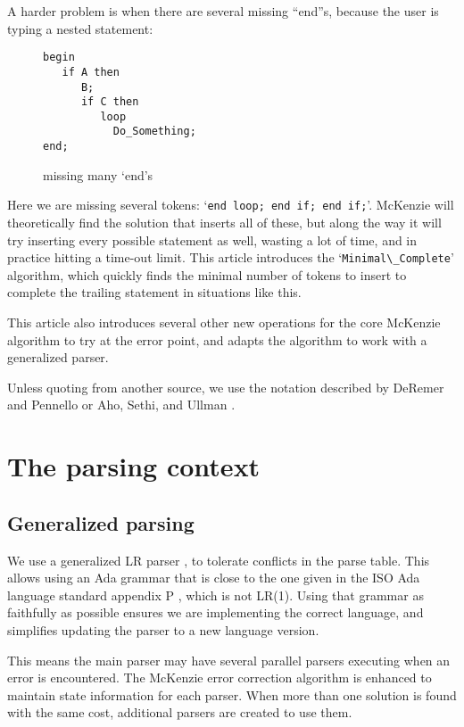 \documentclass[authordraft]{acmart}
\newcommand{\code}[1]{`\lstinline|#1|'}
\begin{document}
A harder problem is when there are several missing ``end''s, because
the user is typing a nested statement:
\begin{figure}[H]
\begin{lstlisting}
begin
   if A then
      B;
      if C then
         loop
           Do_Something;
end;
\end{lstlisting}
\caption{missing many `end's}
\label{ex:min_com_if_if_loop}
\end{figure}

Here we are missing several tokens: \code{end loop; end if; end if;}.
McKenzie will theoretically find the solution that inserts all of
these, but along the way it will try inserting every possible
statement as well, wasting a lot of time, and in practice hitting a
time-out limit. This article introduces the \code{Minimal\_Complete}
algorithm, which quickly finds the minimal number of tokens to insert
to complete the trailing statement in situations like this.

This article also introduces several other new operations for the core
McKenzie algorithm to try at the error point, and adapts the algorithm
to work with a generalized parser.

Unless quoting from another source, we use the notation described by
DeRemer and Pennello \citep{DeRemer_1982} or Aho, Sethi, and Ullman
\citep{dragon}.

\section{The parsing context}
\subsection{Generalized parsing}
We use a generalized LR parser \citet{Tomita_1986}, to tolerate
conflicts in the parse table. This allows using an Ada grammar that is
close to the one given in the ISO Ada language standard appendix P
\citep{Ada_2012}, which is not LR(1). Using that grammar as faithfully
as possible ensures we are implementing the correct language, and
simplifies updating the parser to a new language version.

This means the main parser may have several parallel parsers executing
when an error is encountered. The McKenzie error correction algorithm
is enhanced to maintain state information for each parser. When more
than one solution is found with the same cost, additional parsers are
created to use them.
\end{document}
